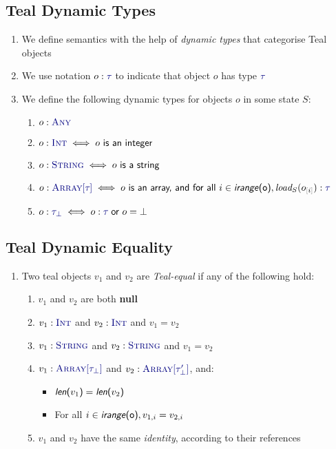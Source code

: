 \documentclass{article}
\newcommand{\Ty}[1]{\textcolor{dblue}{#1}}
\newcommand{\TString}{\Ty{\textsc{String}}}
\newcommand{\TInt}{\Ty{\textsc{Int}}}
\newcommand{\TAny}{\Ty{\textsc{Any}}}
\newcommand{\TArrayof}[1]{\Ty{\textsc{Array}[#1]}}
\newcommand{\Ttau}[1][{}]{\Ty{\tau_{#1}}}
\newcommand{\Vnull}[0]{\textbf{\textcolor{dcyan}{null}}}
\newcommand{\arraylength}[1]{\textsf{\textit{len}(#1)}}
\newcommand{\arrayindices}[1]{\textsf{\textit{irange}(#1)}}
\newcommand{\arrsub}[2]{#1_{\textcolor{gray}{[}#2\textcolor{gray}{]}}}
\begin{document}
\subsection{Teal Dynamic Types}
\begin{enumerate}
\item We define semantics with the help of \emph{dynamic types} that categorise Teal objects
\item We use notation $o : \Ttau$ to indicate that object $o$ has type $\Ttau$
\item We define the following dynamic types for objects $o$ in some state $S$:
  \begin{enumerate}
    \item $o : \TAny{}$
    \item $o : \TInt{} \iff o \textsf{ is an integer}$
    \item $o : \TString{} \iff o \textsf{ is a string}$
    \item $o : \TArrayof{\Ttau} \iff o \textsf{ is an array, and for all }i \in \arrayindices{o}, \textit{load}_S(\arrsub{o}{i}) : \Ttau$
    \item $o : \Ttau[\bot] \iff o : \Ttau \textsf{ or } o = \bot$
  \end{enumerate}
\end{enumerate}

\subsection{Teal Dynamic Equality}
\begin{enumerate}
\item Two teal objects $v_1$ and $v_2$ are \emph{Teal-equal} if any of the following hold:
  \begin{enumerate}
    \item $v_1$ and $v_2$ are both \Vnull
    \item $v_1 : \TInt$ and $v_2 : \TInt$ and $v_1 = v_2$
    \item $v_1 : \TString$ and $v_2 : \TString$ and $v_1 = v_2$
    \item $v_1 : \TArrayof{\tau_\bot}$ and $v_2 : \TArrayof{\tau'_\bot}$, and:
      \begin{itemize}
        \item $\arraylength{$v_1$} = \arraylength{$v_2$}$
        \item For all $i \in \arrayindices{o}, v_{1,i} = v_{2,i}$
      \end{itemize}
    \item $v_1$ and $v_2$ have the same \emph{identity}, according to their references
  \end{enumerate}
\end{enumerate}
\end{document}
